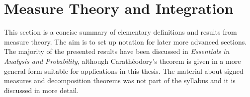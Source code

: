 \section{Measure Theory and Integration}
\label{section:appendix:measure}
This section is a concise summary of elementary definitions and results from measure theory. The aim is to set up notation for later more advanced sections. The majority of the presented results have been discussed in \textit{Essentials in Analysis and Probability}, although Carathéodory's theorem is given in a more general form suitable for applications in this thesis. The material about signed measures and decomposition theorems was not part of the syllabus and it is discussed in more detail.




